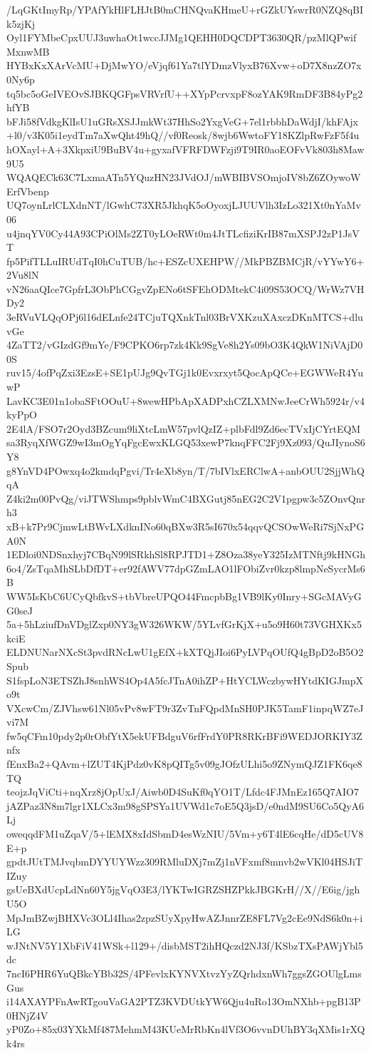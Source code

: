 /LqGKtImyRp/YPAfYkHlFLHJtB0mCHNQvaKHmeU+rGZkUYswrR0NZQ8qBIk5zjKj
Oyl1FYMbeCpxUUJ3uwhaOt1wccJJMg1QEHH0DQCDPT3630QR/pzMlQPwifMxnwMB
HYBxKxXArVcMU+DjMwYO/eVjqf61Ya7tlYDmzVlyxB76Xvw+oD7X8nzZO7x0Ny6p
tq5bc5oGeIVEOvSJBKQGFpsVRVrfU++XYpPcrvxpF8ozYAK9RmDF3B84yPg2hfYB
bFJi58fVdkgKlIsU1uGRsXSJJmkWt37HhSo2YxgVeG+7el1rbbhDaWdjI/khFAjx
+l0/v3K05i1eydTm7aXwQht49hQ//vf0Reosk/8wjb6WwtoFY18KZlpRwFzF5f4u
hOXayl+A+3XkpxiU9BuBV4u+gyxafVFRFDWFzji9T9IR0aoEOFvVk803h8Maw9U5
WQAQECk63C7LxmaATn5YQuzHN23JVdOJ/mWBIBVSOmjoIV8bZ6ZOywoWErfVbenp
UQ7oynLrlCLXdnNT/lGwhC73XR5JkhqK5oOyoxjLJUUVlh3IzLo321Xt0nYaMv06
u4jnqYV0Cy44A93CPiOlMs2ZT0yLOeRWt0m4JtTLcfiziKrIB87mXSPJ2zP1JsVT
fp5PifTLLuIRUdTqI0hCuTUB/hc+ESZcUXEHPW//MkPBZBMCjR/vYYwY6+2Vu8lN
vN26aaQIce7GpfrL3ObPhCGgvZpENo6tSFEhODMtekC4i09S53OCQ/WrWz7VHDy2
3eRVuVLQqOPj6l16dELnfe24TCjuTQXnkTnl03BrVXKzuXAxczDKnMTCS+dluvGe
4ZaTT2/vGIzdGf9mYe/F9CPKO6rp7zk4Kk9SgVe8h2Ys09bO3K4QkW1NiVAjD00S
ruv15/4ofPqZxi3EzsE+SE1pUJg9QvTGj1k0Evxrxyt5QocApQCe+EGWWeR4YuwP
LavKC3E01n1obaSFtOOuU+8wewHPbApXADPxhCZLXMNwJeeCrWh5924r/v4kyPpO
2E4lA/FSO7r2Oyd3BZcum9liXtcLmW57pvlQzIZ+plbFdl9Zd6ecTVxIjCYrtEQM
sa3RyqXfWGZ9wI3mOgYqFgcEwxKLGQ53xewP7knqFFC2Fj9Xz093/QuJIynoS6Y8
g8YnVD4POwxq4o2kmdqPgvi/Tr4eXb8yn/T/7bIVlxERClwA+anbOUU2SjjWhQqA
Z4ki2m00PvQg/viJTWShmps9pblvWmC4BXGutj85nEG2C2V1pgpw3c5ZOnvQnrh3
xB+k7Pr9CjmwLtBWvLXdknINo60qBXw3R5sI670x54qqvQCSOwWeRi7SjNxPGA0N
1EDloi0NDSnxhyj7CBqN99lSRkhSl8RPJTD1+Z8Oza38yeY325IzMTNftj9kHNGh
6o4/ZsTqaMhSLbDfDT+er92fAWV77dpGZmLAO1lFObiZvr0kzp8lmpNeSycrMs6B
WW5IsKbC6UCyQbfkvS+tbVbreUPQO44FmcpbBg1VB9lKy0Inry+SGcMAVyGG0seJ
5a+5hLziufDnVDglZxp0NY3gW326WKW/5YLvfGrKjX+u5o9H60t73VGHXKx5kciE
ELDNUNarNXcSt3pvdRNcLwU1gEfX+kXTQjJIoi6PyLVPqOUfQ4gBpD2oB5O2Spub
S1fspLoN3ETSZhJ8snhWS4Op4A5fcJTnA0ihZP+HtYCLWczbywHYtdKIGJmpXo9t
VXcwCm/ZJVhsw61Nl05vPv8wFT9r3ZvTnFQpdMnSH0PJK5TamF1inpqWZ7eJvi7M
fw5qCFm10pdy2p0rObfYtX5ekUFBdguV6rfFrdY0PR8RKrBFi9WEDJORKIY3Znfx
fEnxBa2+QAvm+lZUT4KjPdz0vK8pQITg5v09gJOfzULhi5o9ZNymQJZ1FK6qe8TQ
teojzJqViCti+nqXrz8jOpUxJ/Aiwb0D4SuKf0qYO1T/Lfdc4FJMnEz165Q7AIO7
jAZPaz3N8m7lgr1XLCx3m98gSPSYa1UVWd1c7oE5Q3jsD/e0ndM9SU6Co5QyA6Lj
oweqqdFM1uZqaV/5+lEMX8xIdSbmD4esWzNIU/5Vm+y6T4lE6cqHe/dD5cUV8E+p
gpdtJUtTMJvqbmDYYUYWzz309RMluDXj7mZj1nVFxmf8mnvb2wVKl04HSJiTIZuy
gsUeBXdUcpLdNn60Y5jgVqO3E3/lYKTwIGRZSHZPkkJBGKrH//X//E6ig/jghU5O
MpJmBZwjBHXVc3OLl4Ihas2zpzSUyXpyHwAZJnnrZE8FL7Vg2cEe9NdS6k0n+iLG
wJNtNV5Y1XbFiV41WSk+l129+/disbMST2ihHQczd2NJ3f/KSbzTXsPAWjYbl5dc
7ncI6PHR6YuQBkcYBb32S/4PFevlxKYNVXtvzYyZQrhdxnWh7ggsZGOUlgLmsGus
i14AXAYPFnAwRTgouVaGA2PTZ3KVDUtkYW6Qju4uRo13OmNXhb+pgB13P0HNjZ4V
yP0Zo+85x03YXkMf487MehmM43KUeMrRbKn4lVf3O6vvnDUhBY3qXMis1rXQk4rs
